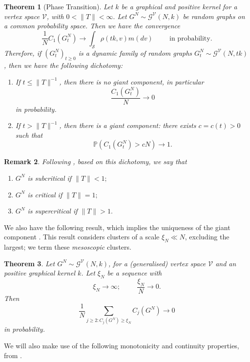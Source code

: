 \documentclass[11pt, notitlepage]{article}
\newtheorem{thm}{Theorem}[section]
\newtheorem{rmk}[thm]{Remark}
\begin{document}
   \begin{thm}[Phase Transition]\label{thrm: RG1} Let $k$ be a graphical and positive kernel for a vertex space $\mathcal{V}$, with $0<\|T\|< \infty.$ Let $G^N\sim \mathcal{G}^\mathcal{V}(N, k)$ be random graphs on a common probability space. Then we have the convergence \begin{equation}
       \frac{1}{N}C_1(G^N_t)\rightarrow \int_{\mathcal{S}} \rho(tk, v) m(dv) \hspace{1cm} \text{in probability.}
   \end{equation}
   Therefore, if $(G^N_t)_{t\geq 0}$ is a dynamic family of random graphs $
       G^N_t \sim \mathcal{G}^\mathcal{V}(N, tk)$, then we have the following dichotomy:  \begin{enumerate}[label=\roman{*}).]
       \item If $t\leq \|T\|^{-1}$, then there is no giant component, in particular \begin{equation}
           \frac{C_1(G^N_t)}{N} \rightarrow 0
       \end{equation} in probability.
       \item If $t>\|T\|^{-1}$, then there is a giant component: there exists $c=c(t)>0$ such that
       \begin{equation}
           \mathbb{P}(C_1(G^N_t)>cN)\rightarrow 1.
       \end{equation}
   \end{enumerate}\end{thm}
   \begin{rmk} Following \cite{BJR07}, based on this dichotomy, we say that \begin{enumerate}[label=\roman{*}).]
       \item $G^N$ is \emph{subcritical} if $\|T\|<1;$
       \item $G^N$ is \emph{critical} if $\|T\|=1;$
       \item $G^N$ is \emph{supercritical} if $\|T\|>1.$
   \end{enumerate} \end{rmk} We also have the following result, which implies the uniqueness of the giant component \cite[Theorem 3.6]{BJR07}. This result considers clusters of a scale $\xi_N\ll N$, excluding the largest; we term these \emph{mesoscopic} clusters.
   \begin{thm}\label{thrm: RG2} Let $G^N\sim \mathcal{G}^\mathcal{V}(N, k)$, for a (generalised) vertex space $\mathcal{V}$ and an positive graphical kernel $k$. Let $\xi_N$ be a sequence with  \begin{equation}
       \xi_N\rightarrow \infty; \hspace{1cm} \frac{\xi_N}{N}\rightarrow 0.
   \end{equation} Then \begin{equation}
       \frac{1}{N}\sum_{j\geq 2: C_j(G^N)\geq \xi_N}C_j(G^N) \rightarrow 0
   \end{equation} in probability. \end{thm}   We will also make use of the following monotonicity and continuity properties, from \cite[Theorem 6.4]{BJR07}.
\end{document}
